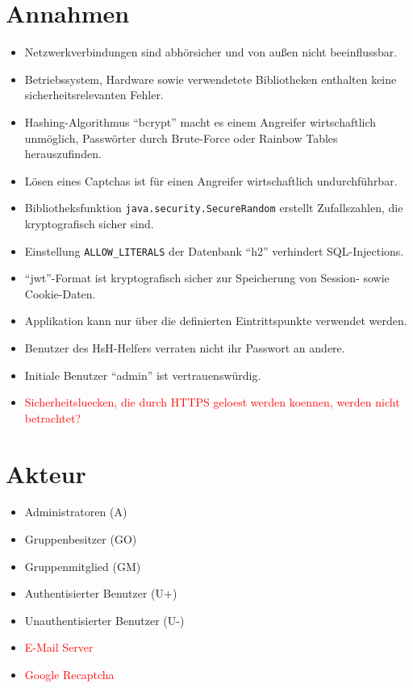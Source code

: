 \documentclass[12pt,DIV14,BCOR10mm,a4paper,parskip=half-,english,ngerman,bibliography=totocnumbered]{scrreprt}
\begin{document}
\vspace*{-3cm}

\clearpage

\tableofcontents  %

\clearpage

\chapter{Annahmen}

\begin{itemize}
  \item Netzwerkverbindungen sind abhörsicher und von außen nicht beeinflussbar.
  \item Betriebssystem, Hardware sowie verwendetete Bibliotheken enthalten keine sicherheitsrelevanten Fehler.
  \item Hashing-Algorithmus \enquote{bcrypt} macht es einem Angreifer wirtschaftlich unmöglich, Passwörter durch Brute-Force oder Rainbow Tables herauszufinden.
  \item Lösen eines Captchas ist für einen Angreifer wirtschaftlich undurchführbar.
  \item Bibliotheksfunktion \texttt{java.security.SecureRandom} \autocite{JavaDocs.SecureRandom} erstellt Zufallszahlen, die kryptografisch sicher sind.
  \item Einstellung \texttt{ALLOW\_LITERALS} der Datenbank \enquote{h2} verhindert SQL-Injections.
  \item \enquote{\gls{jwt}}-Format ist kryptografisch sicher zur Speicherung von Session- sowie Cookie-Daten.
  \item Applikation kann nur über die definierten Eintrittspunkte verwendet werden.
  \item Benutzer des HsH-Helfers verraten nicht ihr Passwort an andere.
  \item Initiale Benutzer \enquote{admin} ist vertrauenswürdig.
  \item \textcolor{red}{Sicherheitsluecken, die durch HTTPS geloest werden koennen, werden nicht betrachtet?}
\end{itemize}

\chapter{Akteur}

\begin{itemize}
  \item Administratoren (A)
  \item Gruppenbesitzer (GO)
  \item Gruppenmitglied (GM)
  \item Authentisierter Benutzer (U+)
  \item Unauthentisierter Benutzer (U-)
  \item \textcolor{red}{E-Mail Server}
  \item \textcolor{red}{Google Recaptcha}
\end{itemize}
\end{document}
